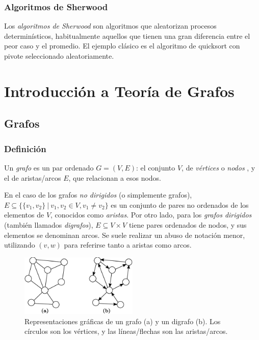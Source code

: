 \documentclass[a4paper]{report}
\begin{document}
\subsection{Algoritmos de Sherwood}

Los \textit{algoritmos de Sherwood} son algoritmos que aleatorizan procesos determinísticos, habitualmente aquellos que tienen una gran diferencia entre el peor caso y el promedio. El ejemplo clásico es el algoritmo de quicksort con pivote seleccionado aleatoriamente.

\chapter{Introducción a Teoría de Grafos}

\section{Grafos}

\subsection{Definición}

Un \textit{grafo} es un par ordenado $G = (V, E)$: el conjunto $V$, de \textit{vértices} o \textit{nodos} , y el de aristas/arcos $E$, que relacionan a esos nodos.

En el caso de los grafos \textit{no dirigidos} (o simplemente grafos), $E \subseteq \{\{v_1, v_2\}\ |\ v_1,v_2 \in V, v_1 \neq v_2 \}$ es un conjunto de pares no ordenados de los elementos de $V$, conocidos como \textit{aristas}. Por otro lado, para los \textit{grafos dirigidos} (también llamados \textit{digrafos}), $E \subseteq V \times V$ tiene pares ordenados de nodos, y sus elementos se denominan arcos. Se suele realizar un abuso de notación menor, utilizando $(v, w)$ para referirse tanto a aristas como arcos.

\begin{figure}[H]
    \centering
    \includegraphics[width=0.5\textwidth]{ejemplo_grafo.png}
    \small
    \caption*{Representaciones gráficas de un grafo (a) y un digrafo (b). Los círculos son los vértices, y las líneas/flechas son las aristas/arcos.}
\end{figure}
\end{document}
